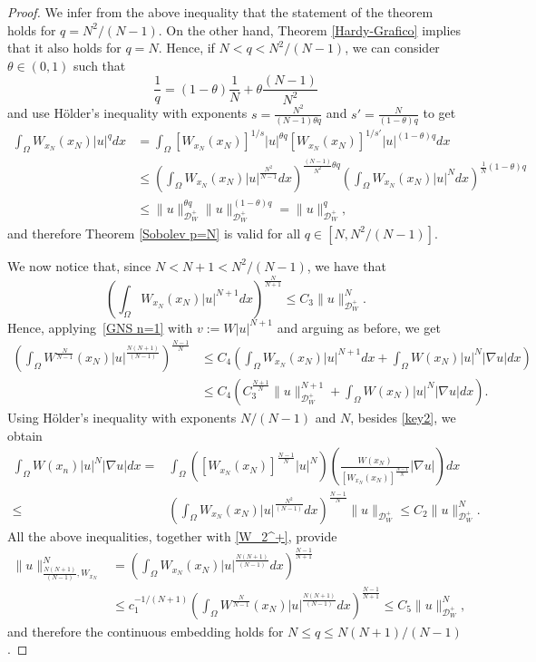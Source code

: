 \documentclass[10pt,a4paper]{amsart}
\newcommand{\dint}{\int_{\Omega}}
\begin{document}
\begin{proof}
        We infer from the above inequality that the statement of the theorem holds 
        for $q=N^2/(N-1)$.  
        On the other hand, Theorem \ref{Hardy-Grafico} implies that it also holds 
        for $q=N$. Hence, if $N<q<N^2/(N-1)$, we can consider $\theta \in (0,1)$ such that
        $$
            \frac{1}{q} = (1-\theta)\frac{1}{N} + \theta \frac{(N-1)}{N^2}
        $$
        and use H\"older's inequality with exponents $s=\frac{N^2}{(N-1)\theta q}$ 
        and $s'=\frac{N}{(1-\theta)q}$ to get
        \begin{align*}
        \dint W_{x_N}(x_N)|u|^q dx &= \dint [W_{x_N}(x_N)]^{1/s} |u|^{\theta q} 
        [W_{x_N}(x_N)]^{1/s'}|u|^{(1-\theta)q} dx \\ & \leq \left( 
        \dint W_{x_N}(x_N)|u|^{\frac{N^2}{N-1}} dx \right)^{\frac{(N-1)}{N^2} 
        \theta q} \left( \dint W_{x_N}(x_N)|u|^{N} dx \right)^{\frac{1}{N}(1-\theta)q} \\
        & \leq \|u\|_{\mathcal{D}_W^+}^{\theta q} \|u\|_{\mathcal{D}_W^+}^{(1-\theta) q}  
        = \|u\|_{\mathcal{D}_W^+}^{q},
        \end{align*}
        and therefore  
        Theorem \ref{Sobolev p=N} is valid for all $q \in [N,N^2/(N-1)]$. 
        
        We now notice that, since $N<N+1<N^2/(N-1)$,  we have that
		$$
			\left(\dint W_{x_N}(x_N)|u|^{N+1}dx\right)^{\frac{N}{N+1}}\leq 
            C_3\|u\|_{\mathcal{D}_W^+}^N.
		$$
		Hence, applying~\eqref{GNS n=1} with $v:=W|u|^{N+1}$ and arguing as before, we get
			\begin{align*}
			\left(\dint W^{\frac{N}{N-1}}(x_N)|u|^{\frac{N(N+1)}{(N-1)}} \right)^{\frac{N-1}{N}}
            &\leq C_4\left(\dint W_{x_N}(x_N)|u|^{N+1}dx +\dint W(x_N)|u|^N
            |\nabla u|dx\right) \\
			   &\leq  C_4 \left( C_3^{\frac{N+1}{N}}\|u\|_{\mathcal{D}_W^+}^{N+1} + 
               \dint W(x_N)|u|^N|\nabla u|dx\right) .
		\end{align*}
		Using H\"older's inequality with exponents $N/(N-1)$ and $N$, 
        besides \eqref{key2}, we obtain
      \begin{align*}
			\dint  W(x_n)|u|^{N}|\nabla u|dx=&\dint \left( 
            [W_{x_N}(x_N)]^{\frac{N-1}{N}}|u|^N \right) 
            \left( \frac{W(x_N)}{[W_{x_N}(x_N)]^{\frac{N-1}{N}}}|\nabla u| \right)dx\\
			\leq&\left(\dint W_{x_N}(x_N)|u|^{\frac{N^2}{(N-1)}}dx\right)^{\frac{N-1}{N}} 
            \|u\|_{\mathcal{D}_W^+}  \leq C_2\|u\|_{\mathcal{D}_W^+}^{N}.
		\end{align*}
        All the above inequalities, together with \eqref{W_2^+}, provide
        \begin{align*}
			\|u\|_{\frac{N(N+1)}{(N-1)},W_{x_N}}^N & = \left(\dint 
            W_{x_N}(x_N)|u|^{\frac{N(N+1)}{(N-1)}}dx \right)^{\frac{N-1}{N+1}} \\
            &\leq c_1^{-1/(N+1)}\left(\dint W^{\frac{N}{N-1}}(x_N)|u|^{\frac{N(N+1)}{(N-1)}}dx 
            \right)^{\frac{N-1}{N+1}} \leq C_5 \|u\|_{\mathcal{D}_W^+}^N,
		\end{align*}
        and therefore  the continuous  embedding holds for $N \leq q \leq N(N+1)/(N-1)$.
		

\end{proof}
\end{document}
